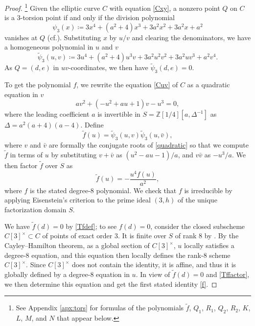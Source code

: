\documentclass{gtpart}
\theoremstyle{definition}
\theoremstyle{remark}
\newcommand{\mb}[1]{\mathbb{#1}}
\newcommand{\cf}{cf.\thinspace}
\newcommand{\BZ}{{\mb Z}}
\newcommand{\Tf}{\widetilde{f}}
\newcommand{\TP}{\widetilde{\psi}}
\begin{document}
\begin{proof}
 \footnote{See Appendix \ref{apx:tors} for formulas of the polynomials $\Tf$, $Q_1$, $R_1$, $Q_2$, $R_2$, $K$, $L$, $M$, and $N$ that appear below.  }
 Given the elliptic curve $C$ with equation \eqref{Cxy}, a nonzero point $Q$ on $C$ is a 3-torsion point if and only if the division polynomial 
 \begin{equation}
 \label{divpoly}
  \psi_3 (x) \coloneqq 3 x^4 + (a^2 + 4) x^3 + 3 a^2 x^2 + 3 a^2 x + a^2 
 \end{equation}
 vanishes at $Q$ (\cf \cite[Exercise 3.7f]{AEC}).  Substituting $x$ by $u/v$ and clearing the denominators, we have a homogeneous polynomial in $u$ and $v$ 
 \[
  \TP_3(u,v) \coloneqq 3 u^4 + (a^2 + 4) u^3 v + 3 a^2 u^2 v^2 + 3 a^2 u v^3 + a^2 v^4.  
 \]
 As $Q = (d,e)$ in $uv$-coordinates, we then have $\TP_3(d,e) = 0$.  

 To get the polynomial $f$, we rewrite the equation \eqref{Cuv} of $C$ as a quadratic equation in $v$ 
 \begin{equation}
 \label{quadratic}
  a v^2 + (-u^2 + a u + 1) v - u^3 = 0, 
 \end{equation}
 where the leading coefficient $a$ is invertible in $S = \BZ [1/4] [a, \Delta^{-1}]$ as $\Delta = a^2 (a + 4) (a - 4)$.  
 Define 
 \begin{equation}
 \label{Tfdef}
  \Tf(u) = \TP_3(u,v) \TP_3(u,\bar{v}), 
 \end{equation}
 where $v$ and $\bar{v}$ are formally the conjugate roots of \eqref{quadratic} 
 so that we compute $\Tf$ in terms of $u$ by substituting $v + \bar{v}$ as $(u^2 - a u - 1) / a$, and $v \bar{v}$ as $-u^3 / a$.  
 We then factor $\Tf$ over $S$ as 
 \begin{equation}
 \label{Tffactor}
  \Tf(u) = -\frac{u^4 f(u)}{a^2}, 
 \end{equation}
 where $f$ is the stated degree-8 polynomial.  
 We check that $f$ is irreducible by applying Eisenstein's criterion to the prime ideal $(3,h)$ of the unique factorization domain $S$.  

 We have $\Tf(d) = 0$ by \eqref{Tfdef}; to see $f(d) = 0$, consider the closed subscheme $C[3]^\times \subset C$ of points of exact order 3.  
 It is finite over $S$ of rank 8 by \cite[Theorem 2.3.1]{KM}.  
 By the Cayley--Hamilton theorem, as a global section of $C[3]^\times$, $u$ locally satisfies a degree-8 equation, 
 and this equation then locally defines the rank-8 scheme $C[3]^\times$.  
 Since $C[3]^\times$ does not contain the identity, it is affine, and thus it is globally defined by a degree-8 equation in $u$.  
 In view of $\Tf(d) = 0$ and \eqref{Tffactor}, we then determine this equation and get the first stated identity \eqref{f}.  


\end{proof}
\end{document}
